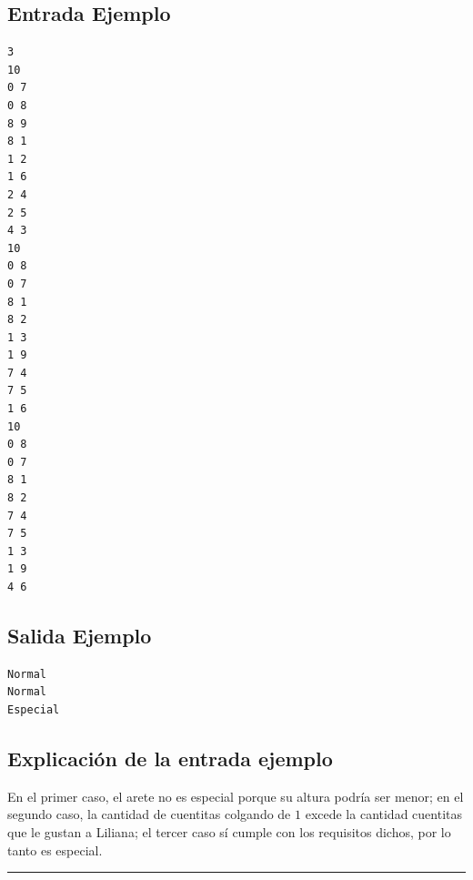 \subsection*{Entrada Ejemplo}
\begin{multicols}{2}
\begin{verbatim}
3
10
0 7
0 8
8 9
8 1
1 2
1 6
2 4
2 5
4 3
10
0 8
0 7
8 1
8 2
1 3
1 9
7 4
7 5
1 6
10
0 8
0 7
8 1
8 2
7 4
7 5
1 3
1 9
4 6
\end{verbatim}
\columnbreak
\subsection*{Salida Ejemplo}
\begin{verbatim}
Normal
Normal
Especial
\end{verbatim}
\end{multicols}


\subsection*{Explicación de la entrada ejemplo}
En el primer caso, el arete no es especial porque su altura podría ser menor; en el segundo caso, la cantidad de cuentitas colgando de $1$ excede la cantidad cuentitas que le gustan a Liliana; el tercer caso sí cumple con los requisitos dichos, por lo tanto es especial.

\noindent \rule[0.5ex]{1\columnwidth}{1pt}



